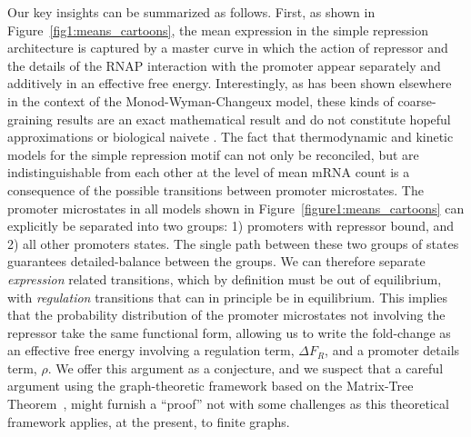 Our key insights can be summarized as follows. First, as shown in
Figure~\ref{fig1:means_cartoons}, the mean expression in the simple repression
architecture is captured by a master curve in which the action of repressor and
the details of the RNAP interaction with the promoter appear separately and
additively in an effective free energy. Interestingly, as has been shown
elsewhere in the context of the Monod-Wyman-Changeux model, these kinds of
coarse-graining results are an exact mathematical result and do not constitute
hopeful approximations or biological naivete \cite{Razo-Mejia2018, Chure2019}.
The fact that thermodynamic and kinetic models for the simple repression motif
can not only be reconciled, but are indistinguishable from each other at the
level of mean mRNA count is a consequence of the possible transitions between
promoter microstates. The promoter microstates in all models shown in
Figure~\ref{figure1:means_cartoons} can explicitly be separated into two groups:
1) promoters with repressor bound, and 2) all other promoters states. The single
path between these two groups of states guarantees detailed-balance between the
groups. We can therefore separate \textit{expression} related transitions, which
by definition must be out of equilibrium, with \textit{regulation} transitions
that can in principle be in equilibrium. This implies that the probability
distribution of the promoter microstates not involving the repressor take the
same functional form, allowing us to write the fold-change as an effective free
energy involving a regulation term, $\Delta F_R$, and a promoter details term,
$\rho$. We offer this argument as a conjecture, and we suspect that a careful
argument using the graph-theoretic framework based on the Matrix-Tree
Theorem~\cite{Gunawardena2012}, might furnish a ``proof'' not with some 
challenges as this theoretical framework applies, at the present, to finite 
graphs. 

